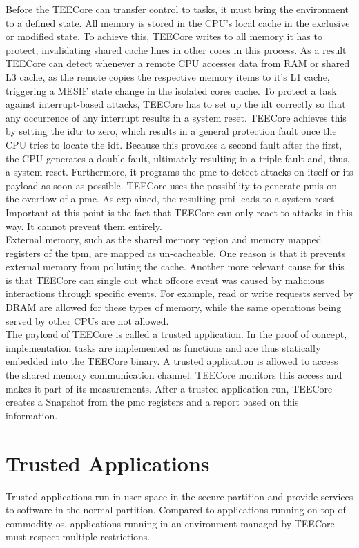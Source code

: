 Before the TEECore can transfer control to tasks, it must bring the environment
to a defined state. All memory is stored in the CPU's local cache in the
exclusive or modified state. To achieve this, TEECore writes to all memory it
has to protect, invalidating shared cache lines in other cores in this process.
As a result TEECore can detect whenever a remote CPU accesses data from RAM or
shared L3 cache, as the remote copies the respective memory items to it's L1
cache, triggering a MESIF state change in the isolated cores cache. To protect a
task against interrupt-based attacks, TEECore has to set up the \gls{idt}
correctly so that any occurrence of any interrupt results in a system reset.
TEECore achieves this by setting the \gls{idtr} to zero, which results in a
general protection fault once the CPU tries to locate the \gls{idt}. Because
this provokes a second fault after the first, the CPU generates a double fault,
ultimately resulting in a triple fault and, thus, a system reset. Furthermore,
it programs the \gls{pmc} to detect attacks on itself or its payload as soon as
possible. TEECore uses the possibility to generate \glspl{pmi} on the overflow
of a \gls{pmc}. As explained, the resulting \gls{pmi} leads to a system reset.
Important at this point is the fact that TEECore can only react to attacks in
this way. It cannot prevent them entirely.\\

External memory, such as the shared memory region and memory mapped registers of
the \gls{tpm}, are mapped as un-cacheable. One reason is that it prevents
external memory from polluting the cache. Another more relevant cause for this
is that TEECore can single out what offcore event was caused by malicious
interactions through specific events. For example, read or write requests served
by DRAM are allowed for these types of memory, while the same operations being
served by other CPUs are not allowed.\\

The payload of TEECore is called a trusted application. In the proof of concept,
implementation tasks are implemented as functions and are thus statically
embedded into the TEECore binary. A trusted application is allowed to access the
shared memory communication channel. TEECore monitors this access and makes it
part of its measurements. After a trusted application run, TEECore
creates a Snapshot from the \gls{pmc} registers and a report based on this
information.

\section{Trusted Applications}
\label{sec:30:tee_apps}
Trusted applications run in user space in the secure partition and provide
services to software in the normal partition. Compared to applications running
on top of commodity \gls{os}, applications running in an environment managed by
TEECore must respect multiple restrictions.\\

